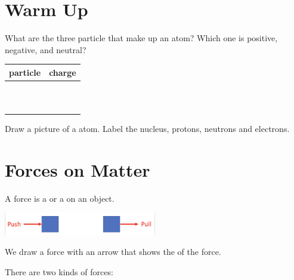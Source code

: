 \documentclass[12pt]{exam}
\begin{document}
\begin{questions}

    \section{Warm Up}

    \question What are the three particle that make up an atom? Which one is positive, negative, and neutral?

   \begin{center}
    \begin{tabular}{|c|c|}
        \hline
        particle & charge \\ \hline
        \hspace{2cm} & \hspace{2cm} \\ \hline
        \ & \ \\ \hline
        \ & \ \\ \hline

    \end{tabular}
   \end{center}


    \question Draw a picture of a  atom. Label the nucleus, protons, neutrons and electrons.

    \vspace{3cm}

    \section{Forces on Matter}

    \question A force is a \fillin or a \fillin on an object.

  \begin{center}
    \includegraphics[width=0.5\textwidth]{pushpull}
  \end{center}


    \question We draw a force with an arrow that shows the \fillin of the force.
    
    
    \question There are two kinds of forces:
    


\end{questions}
\end{document}
